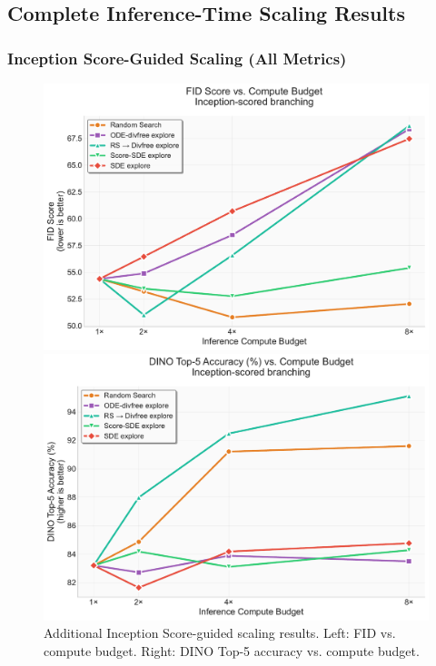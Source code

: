 \documentclass{article}
\begin{document}
\subsection{Complete Inference-Time Scaling Results}

\subsubsection{Inception Score-Guided Scaling (All Metrics)}

\begin{figure}[H]
  \centering
  \begin{minipage}{0.48\textwidth}
    \centering
    \includegraphics[width=\textwidth]{figures/scaling_inception_fid.pdf}
  \end{minipage}
  \hfill
  \begin{minipage}{0.48\textwidth}
    \centering
    \includegraphics[width=\textwidth]{figures/scaling_inception_top5.pdf}
  \end{minipage}
  \caption{Additional Inception Score-guided scaling results. Left: FID vs. compute budget. Right: DINO Top-5 accuracy vs. compute budget.}
  \label{fig:inception-scaling-complete}
\end{figure}
\end{document}
